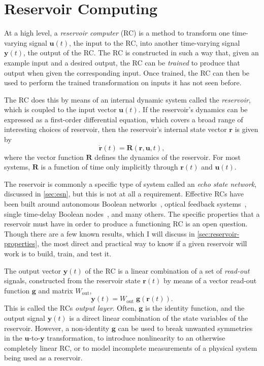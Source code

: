 \chapter{Reservoir Computing}\label{ch:reservoir-computing}

At a high level, a \emph{reservoir computer} (RC) is a method to
transform one time-varying signal $\bm{u}(t)$, the input to the RC,
into another time-varying signal $\bm{y}(t)$, the output of the
RC. The RC is constructed in such a way that, given an example input
and a desired output, the RC can be \emph{trained} to produce that
output when given the corresponding input. Once trained, the RC can
then be used to perform the trained transformation on inputs it has
not seen before.

The RC does this by means of an internal dynamic system called the
\emph{reservoir}, which is coupled to the input vector $\bm{u}(t)$. If the
reservoir's dynamics can be expressed as a first-order differential
equation, which covers a broad range of interesting choices of
reservoir, then the reservoir's internal state vector $\bm{r}$ is given by
\begin{equation}
  \label{eq:reservoir}
  \dot{\mathbf{r}}(t) = \mathbf{R}\left(\mathbf{r}, \mathbf{u}, t\right),
\end{equation}
where the vector function $\mathbf{R}$ defines the dynamics of the reservoir. For most systems, $\mathbf{R}$ is a function of time only implicitly through $\bm{r}(t)$ and $\bm{u}(t)$.

The reservoir is commonly a specific type of system called an
\emph{echo state network}, discussed in \cref{sec:esn}, but this is
not at all a requirement. Effective RCs have been built around
autonomous Boolean networks~\cite{canaday2018}, optical feedback
systems~\cite{antonik2016}, single time-delay Boolean
nodes~\cite{haynes2015}, and many others. The specific properties that
a reservoir must have in order to produce a functioning RC is an open
question. Though there are a few known results, which I will discuss
in \cref{sec:reservoir-properties}, the most direct and practical way
to know if a given reservoir will work is to build, train, and test
it.

The output vector $\bm{y}(t)$ of the RC is a linear
combination of a set of \emph{read-out} signals, constructed from the
reservoir state $\bm{r}(t)$ by means of a vector read-out function $\bm{g}$ and matrix $W_\text{out}$,
\begin{equation}
  \label{eq:output}
  \bm{y}(t) = W_\text{out}\;\bm{g}\left(\bm{r}(t)\right).
\end{equation}
This is called the RCs \emph{output layer}. Often, $\bm{g}$ is the
identity function, and the output signal $\bm{y}(t)$ is a direct
linear combination of the state variables of the reservoir. However, a
non-identity $\bm{g}$ can be used to break unwanted symmetries in the
$\bm{u}$-to-$\bm{y}$ transformation, to introduce nonlinearity to an
otherwise completely linear RC, or to model incomplete measurements of
a physical system being used as a reservoir.

